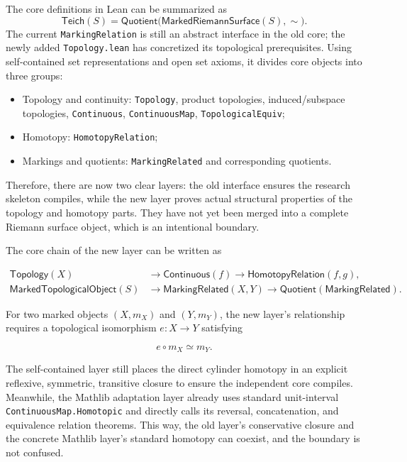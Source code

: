 \documentclass[UTF8,a4paper,11pt]{article}
\begin{document}
The core definitions in Lean can be summarized as
\[
  \mathsf{Teich}(S)=
  \mathsf{Quotient}\bigl(\mathsf{MarkedRiemannSurface}(S),\sim\bigr).
\]
The current \texttt{MarkingRelation} is still an abstract interface in the old core; the newly added \texttt{Topology.lean} has concretized its topological prerequisites. Using self-contained set representations and open set axioms, it divides core objects into three groups:

\begin{itemize}
  \item Topology and continuity: \texttt{Topology}, product topologies, induced/subspace topologies, \texttt{Continuous}, \texttt{ContinuousMap}, \texttt{TopologicalEquiv};
  \item Homotopy: \texttt{HomotopyRelation};
  \item Markings and quotients: \texttt{MarkingRelated} and corresponding quotients.
\end{itemize}

Therefore, there are now two clear layers: the old interface ensures the research skeleton compiles, while the new layer proves actual structural properties of the topology and homotopy parts. They have not yet been merged into a complete Riemann surface object, which is an intentional boundary.

The core chain of the new layer can be written as

\[
\begin{aligned}
\mathsf{Topology}(X)&\longrightarrow
\mathsf{Continuous}(f)\longrightarrow
\mathsf{HomotopyRelation}(f,g),\\
\mathsf{MarkedTopologicalObject}(S)&\longrightarrow
\mathsf{MarkingRelated}(X,Y)\longrightarrow
\mathsf{Quotient}(\mathsf{MarkingRelated}).
\end{aligned}
\]

For two marked objects $(X,m_X)$ and $(Y,m_Y)$, the new layer's relationship requires a topological isomorphism $e:X\to Y$ satisfying

\[
e\circ m_X\simeq m_Y.
\]

The self-contained layer still places the direct cylinder homotopy in an explicit reflexive, symmetric, transitive closure to ensure the independent core compiles. Meanwhile, the Mathlib adaptation layer already uses standard unit-interval \texttt{ContinuousMap.Homotopic} and directly calls its reversal, concatenation, and equivalence relation theorems. This way, the old layer's conservative closure and the concrete Mathlib layer's standard homotopy can coexist, and the boundary is not confused.
\end{document}
